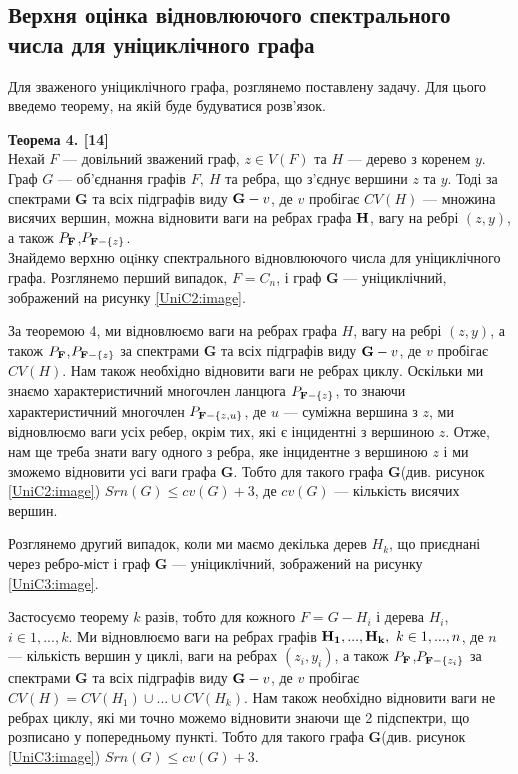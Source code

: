 \subsection{Верхня оцінка відновлюючого спектрального числа для уніциклічного графа}
Для зваженого уніциклічного графа, розглянемо поставлену задачу. Для цього введемо теорему, на якій буде будуватися розв'язок.

\textbf{Теорема 4. [14]}\\
Нехай $F$ --- довільний зважений граф, $z\in V(F)$ та $H$ --- дерево з коренем $y$. Граф ${G}$ --- об'єднання графів $F,\ H$ та ребра, що з'єднує вершини $z$ та $y$. Тоді за спектрами \textbf{G} та всіх підграфів виду ${\bf G} - v$, де $v$ пробігає $CV(H)$ --- множина висячих вершин, можна відновити ваги на ребрах графа $\bf H$, вагу на ребрі $(z,y)$, а також $P_{\bf F}$,$P_{{\bf F}-\{z\}}$.\\

Знайдемо верхню оцiнку спектрального вiдновлюючого числа для уніциклічного графа.
Розглянемо перший випадок, $F=C_n$, і граф \textbf{G} --- уніциклічний, зображений на рисунку \ref{UniC2:image}.

За теоремою 4, ми відновлюємо ваги на ребрах графа $H$, вагу на ребрі $(z,y)$, а також $P_{\bf F}$,$P_{{\bf F}-\{z\}}$ за спектрами \textbf{G} та всіх підграфів виду ${\bf G} - v$, де $v$ пробігає $CV(H)$. Нам також необхідно відновити ваги не ребрах циклу. Оскільки ми знаємо характеристичний многочлен ланцюга $P_{{\bf F}-\{z\}}$, то знаючи характеристичний многочлен $P_{{\bf F}-\{z,u\}}$, де $u$ --- суміжна вершина з $z$, ми відновлюємо ваги усіх ребер, окрім тих, які є інцидентні з вершиною $z$. Отже, нам ще треба знати вагу одного з ребра, яке інцидентне з вершиною $z$ і ми зможемо відновити усі ваги графа \textbf{G}. Тобто для такого графа \textbf{G}(див. рисунок \ref{UniC2:image}) $Srn({G}) \leq cv(G)+3$, де $cv(G)$ --- кількість висячих вершин.

Розглянемо другий випадок, коли ми маємо декілька дерев $H_k$, що приєднані через ребро-міст і граф \textbf{G} --- уніциклічний, зображений на рисунку \ref{UniC3:image}.

Застосуємо теорему $k$ разів, тобто для кожного $F =  G - H_i$ і дерева $H_i$, $i \in 1,...,k$. Ми відновлюємо ваги на ребрах графів ${\bf H_1,...,H_k},\ k\in 1,...,n$, де $n$ --- кількість вершин у циклі, ваги на ребрах $(z_i,y_i)$, а також $P_{\bf F}$,$P_{{\bf F}-\{z_i\}}$ за спектрами \textbf{G} та всіх підграфів виду ${\bf G} - v$, де $v$ пробігає $CV(H) = CV(H_1) \cup ... \cup CV(H_k)$. Нам також необхідно відновити ваги не ребрах циклу, які ми точно можемо відновити знаючи ще 2 підспектри, що розписано у попередньому пункті. Тобто для такого графа \textbf{G}(див. рисунок \ref{UniC3:image}) $Srn({G}) \leq cv(G)+3$.

